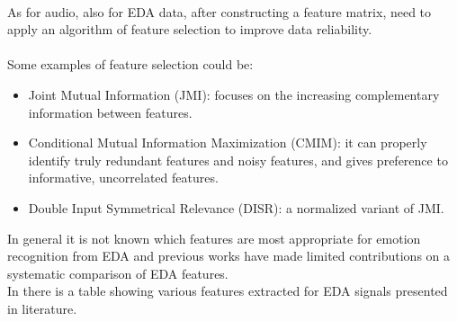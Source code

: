 \\ \indent
As for audio, also for EDA data, after constructing a feature matrix, need to apply an algorithm of feature selection to improve data reliability.
\\ \\
Some examples of feature selection could be:
\begin{itemize}
	\item Joint Mutual Information (JMI): focuses on the increasing complementary information between features.
	\item Conditional Mutual Information Maximization (CMIM): it can properly identify truly redundant features and noisy features, and gives preference to informative, uncorrelated features.
	\item Double Input Symmetrical Relevance (DISR): a normalized variant of JMI.
\end{itemize}
In general it is not known which features are most appropriate for emotion recognition from EDA and previous works have made limited contributions on a systematic comparison of EDA features.
\\
In \cite{shukla2019feature} there is a table showing various features extracted for EDA signals presented in literature.





